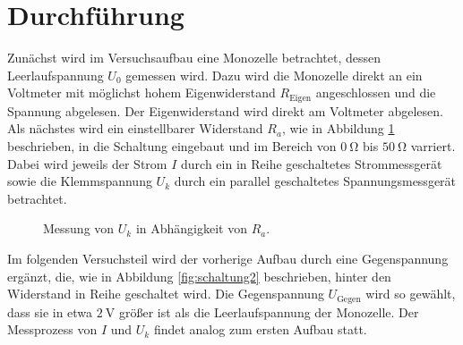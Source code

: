 \section{Durchführung}
\label{sec:Durchführung}

Zunächst wird im Versuchsaufbau eine Monozelle betrachtet, dessen Leerlaufspannung $U_0$ gemessen wird.
Dazu wird die Monozelle direkt an ein Voltmeter mit möglichst hohem Eigenwiderstand $R_{\text{Eigen}}$ angeschlossen und die Spannung abgelesen.
Der Eigenwiderstand wird direkt am Voltmeter abgelesen. \\
Als nächstes wird ein einstellbarer Widerstand $R_a$, wie in Abbildung \ref{fig:schaltung1} beschrieben, in die Schaltung eingebaut und im Bereich von $\SI{0}{\ohm}$ bis $\SI{50}{\ohm}$ varriert.
Dabei wird jeweils der Strom $I$ durch ein in Reihe geschaltetes Strommessgerät sowie die Klemmspannung $U_k$ durch ein parallel geschaltetes Spannungsmessgerät betrachtet.

\begin{figure}[H]
  \centering
    \caption{Messung von $U_k$ in Abhängigkeit von $R_a$.}
    \label{fig:schaltung1}
\end{figure}

Im folgenden Versuchsteil wird der vorherige Aufbau durch eine Gegenspannung ergänzt, die, wie in Abbildung \ref{fig:schaltung2} beschrieben, hinter den Widerstand in Reihe geschaltet wird.
Die Gegenspannung $U_{\text{Gegen}}$ wird so gewählt, dass sie in etwa $\SI{2}{\volt}$ größer ist als die Leerlaufspannung der Monozelle.
Der Messprozess von $I$ und $U_k$ findet analog zum ersten Aufbau statt.


\tikzset{circuit declare symbol = DC source}

